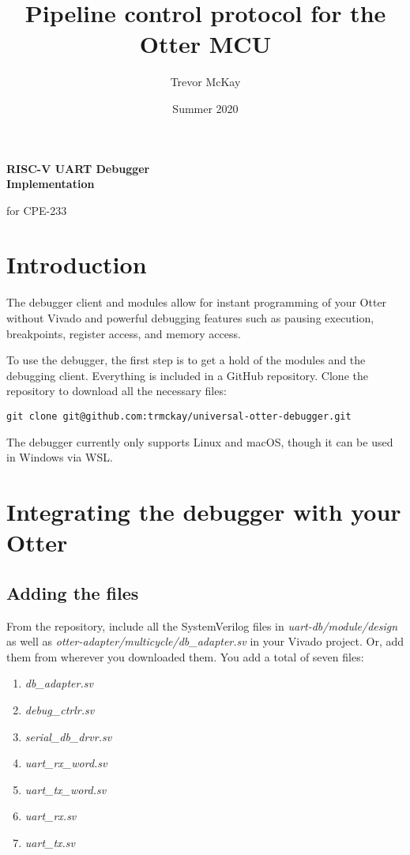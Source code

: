 \documentclass[10pt,a4paper]{article}
\title{Pipeline control protocol for the Otter MCU}
\author{Trevor McKay}
\date{Summer 2020}
\begin{document}
\begin{center}
    \Large\textbf{RISC-V UART Debugger\\Implementation}

    \medskip
    \small{for CPE-233}
\end{center}

\tableofcontents
\newpage

\section{Introduction}
The debugger client and modules allow for instant programming of your Otter without Vivado and
powerful debugging features such as pausing execution, breakpoints, register access,
and memory access.

To use the debugger, the first step is to get a hold of the modules and the debugging client.
Everything is included in a GitHub repository. Clone the repository to download all the necessary
files:

\begin{verbatim}
git clone git@github.com:trmckay/universal-otter-debugger.git
\end{verbatim}

The debugger currently only supports Linux and macOS, though it can be used in Windows via WSL.

\section{Integrating the debugger with your Otter}

\subsection{Adding the files}
From the repository, include all the SystemVerilog files in \emph{uart-db/module/design} as well as
\emph{otter-adapter/multicycle/db\_adapter.sv} in your Vivado project. Or, add them from wherever
you downloaded them. You add a total of seven files:

\begin{enumerate}
    \item \emph{db\_adapter.sv}
    \item \emph{debug\_ctrlr.sv}
    \item \emph{serial\_db\_drvr.sv}
    \item \emph{uart\_rx\_word.sv}
    \item \emph{uart\_tx\_word.sv}
    \item \emph{uart\_rx.sv}
    \item \emph{uart\_tx.sv}
\end{enumerate}
\end{document}
